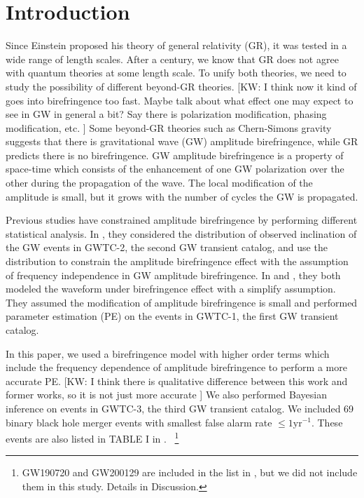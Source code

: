 \documentclass[aps,prd,twocolumn,superscriptaddress,preprintnumbers,floatfix,nofootinbib]{revtex4-2}
\newcommand{\kw}[1]{{\color{rb4}[KW: #1 ]}}
\begin{document}
\section{Introduction}
\label{sec:Introduction}
Since Einstein proposed his theory of general relativity (GR), it was tested in a wide range of length scales.
After a century, we know that GR does not agree with quantum theories at some length scale.
To unify both theories, we need to study the possibility of different beyond-GR theories.
\kw{I think now it kind of goes into birefringence too fast.
Maybe talk about what effect one may expect to see in GW in general a bit?
Say there is polarization modification, phasing modification, etc.}
Some beyond-GR theories such as Chern-Simons gravity suggests that there is gravitational wave (GW) amplitude birefringence, while GR predicts there is no birefringence.
GW amplitude birefringence is a property of space-time which consists of the enhancement of one GW polarization over the other during the propagation of the wave.
The local modification of the amplitude is small, but it grows with the number of cycles the GW is propagated.


Previous studies have constrained amplitude birefringence by performing different statistical analysis.
In \citet{Okounkova_2022}, they considered the distribution of observed inclination of the GW events in GWTC-2, the second GW transient catalog, and use the distribution to constrain the amplitude birefringence effect with the assumption of frequency independence in GW amplitude birefringence.
In \citet{Yamada_2020} and \citet{Wang_2021}, they both modeled the waveform under birefringence effect with a simplify assumption.
They assumed the modification of amplitude birefringence is small and performed parameter estimation (PE) on the events in GWTC-1, the first GW transient catalog.

In this paper, we used a birefringence model with higher order terms which include the frequency dependence of amplitude birefringence to perform a more accurate PE.
\kw{I think there is qualitative difference between this work and former works, so it is not just more accurate}
We also performed Bayesian inference on events in GWTC-3, the third GW transient catalog.
We included 69 binary black hole merger events with smallest false alarm rate $\leq1\mathrm{yr^{-1}}$.
These events are also listed in TABLE I in \citet{GWTC_3_population}.
~\footnote{GW190720 and GW200129 are included in the list in \citet{GWTC_3_population}, but we did not include them in this study.
Details in Discussion.}
\end{document}
